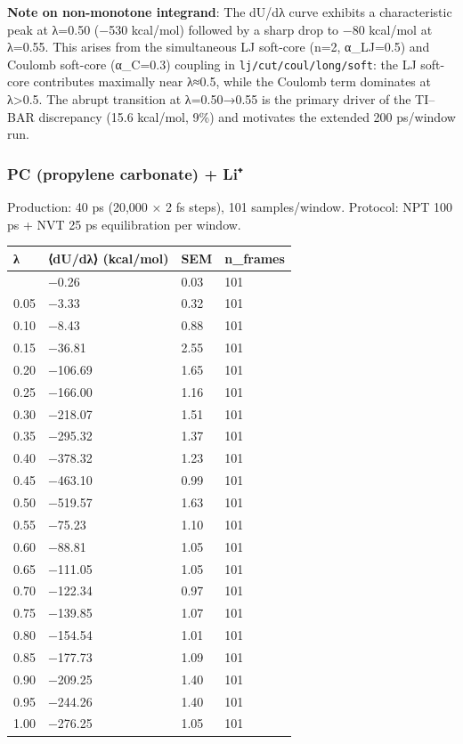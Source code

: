 \documentclass[
  11pt,
]{article}
\newcounter{none} %
\begin{document}
\textbf{Note on non-monotone integrand}: The dU/dλ curve exhibits a
characteristic peak at λ=0.50 (−530 kcal/mol) followed by a sharp drop
to −80 kcal/mol at λ=0.55. This arises from the simultaneous LJ
soft-core (n=2, α\_LJ=0.5) and Coulomb soft-core (α\_C=0.3) coupling in
\texttt{lj/cut/coul/long/soft}: the LJ soft-core contributes maximally
near λ≈0.5, while the Coulomb term dominates at λ\textgreater0.5. The
abrupt transition at λ=0.50→0.55 is the primary driver of the TI--BAR
discrepancy (15.6 kcal/mol, 9\%) and motivates the extended 200
ps/window run.

\subsubsection{PC (propylene carbonate) +
Li⁺}\label{pc-propylene-carbonate-li}

Production: 40 ps (20,000 × 2 fs steps), 101 samples/window. Protocol:
NPT 100 ps + NVT 25 ps equilibration per window.

{\def\LTcaptype{none} %
\begin{longtable}[]{@{}llll@{}}
\toprule\noalign{}
λ & ⟨dU/dλ⟩ (kcal/mol) & SEM & n\_frames \\
\midrule\noalign{}
\endhead
\bottomrule\noalign{}
\endlastfoot
0.00 & −0.26 & 0.03 & 101 \\
0.05 & −3.33 & 0.32 & 101 \\
0.10 & −8.43 & 0.88 & 101 \\
0.15 & −36.81 & 2.55 & 101 \\
0.20 & −106.69 & 1.65 & 101 \\
0.25 & −166.00 & 1.16 & 101 \\
0.30 & −218.07 & 1.51 & 101 \\
0.35 & −295.32 & 1.37 & 101 \\
0.40 & −378.32 & 1.23 & 101 \\
0.45 & −463.10 & 0.99 & 101 \\
0.50 & −519.57 & 1.63 & 101 \\
0.55 & −75.23 & 1.10 & 101 \\
0.60 & −88.81 & 1.05 & 101 \\
0.65 & −111.05 & 1.05 & 101 \\
0.70 & −122.34 & 0.97 & 101 \\
0.75 & −139.85 & 1.07 & 101 \\
0.80 & −154.54 & 1.01 & 101 \\
0.85 & −177.73 & 1.09 & 101 \\
0.90 & −209.25 & 1.40 & 101 \\
0.95 & −244.26 & 1.40 & 101 \\
1.00 & −276.25 & 1.05 & 101 \\
\end{longtable}
}
\end{document}
